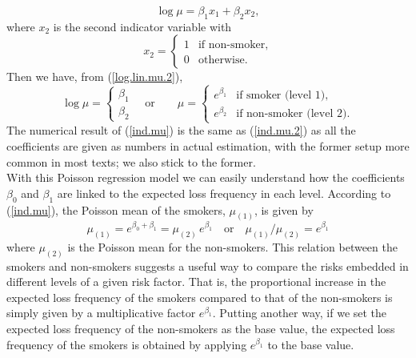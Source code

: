 \documentclass[12pt]{article}
\begin{document}
\begin{equation}
\label{log.lin.mu.2}
\log \mu=\beta_1 x_1+\beta_2 x_2,
\end{equation}
where $x_2$ is the second indicator variable with
\begin{equation}
\label{dummy.x2}x_2=
\begin{cases}
     1 & \text{if non-smoker}, \\
     0 & \text{otherwise}.
\end{cases}
\end{equation} 
Then we have, from (\ref{log.lin.mu.2}),
\begin{equation}
\label{ind.mu.2}\log \mu=
\begin{cases}
     \beta_1 \\
     \beta_2 
\end{cases}
\quad \text{or}\qquad \mu= \begin{cases}
     e^{\beta_1} & \text{if smoker (level 1)}, \\
     e^{\beta_2} & \text{if non-smoker (level 2)}.
\end{cases}
\end{equation} 
The numerical result of (\ref{ind.mu})  is the same as (\ref{ind.mu.2}) as all the coefficients are given as numbers in actual estimation, with the former setup more common in most texts; we also stick to the former. \\

With this Poisson regression model we can easily understand how the coefficients $\beta_0$ and $\beta_1$ are linked to the expected loss frequency in each level. According to (\ref{ind.mu}), the Poisson mean of the smokers, $\mu_{(1)}$, is given by
\begin{equation}
\label{ }
\mu_{(1)}=e^{\beta_0+\beta_1}=\mu_{(2)} \,e^{\beta_1} \quad \text{or}\quad  \mu_{(1)}/\mu_{(2)} =e^{\beta_1}
\end{equation}
where $\mu_{(2)}$ is the Poisson mean for the non-smokers. This relation between the smokers and non-smokers suggests a useful way to compare the risks embedded in different levels of a given risk factor. That is, the proportional increase in the expected loss frequency of the smokers compared to that of the non-smokers is simply given by a multiplicative factor $e^{\beta_1}$. Putting another way, if we set the expected loss frequency of the non-smokers as the base value, the expected  loss frequency of the smokers is obtained by applying $e^{\beta_1}$ to the base value. \\
\end{document}
